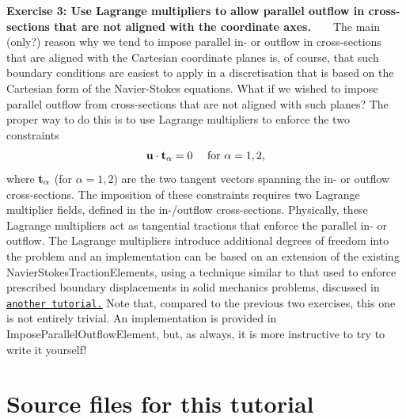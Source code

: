 \begin{DoxyItemize}
\item {\bfseries Exercise 3\+: Use Lagrange multipliers to allow parallel outflow in cross-\/sections that are not aligned with the coordinate axes.} ~\newline
~\newline
 The main (only?) reason why we tend to impose parallel in-\/ or outflow in cross-\/sections that are aligned with the Cartesian coordinate planes is, of course, that such boundary conditions are easiest to apply in a discretisation that is based on the Cartesian form of the Navier-\/\+Stokes equations. What if we wished to impose parallel outflow from cross-\/sections that are not aligned with such planes? The proper way to do this is to use Lagrange multipliers to enforce the two constraints \[ {\bf u} \cdot {\bf t}_\alpha = 0 \mbox{\ \ \ \ for $\alpha = 1,2$,} \] where $ {\bf t}_\alpha $ (for $\alpha = 1,2$) are the two tangent vectors spanning the in-\/ or outflow cross-\/sections. The imposition of these constraints requires two Lagrange multiplier fields, defined in the in-\//outflow cross-\/sections. Physically, these Lagrange multipliers act as tangential tractions that enforce the parallel in-\/ or outflow. The Lagrange multipliers introduce additional degrees of freedom into the problem and an implementation can be based on an extension of the existing {\ttfamily Navier\+Stokes\+Traction\+Elements}, using a technique similar to that used to enforce prescribed boundary displacements in solid mechanics problems, discussed in \href{../../../solid/prescribed_displ_lagr_mult/html/index.html}{\tt another tutorial.} Note that, compared to the previous two exercises, this one is not entirely trivial. An implementation is provided in {\ttfamily Impose\+Parallel\+Outflow\+Element}, but, as always, it is more instructive to try to write it yourself!
\end{DoxyItemize}



 

\hypertarget{index_sources}{}\section{Source files for this tutorial}\label{index_sources}

